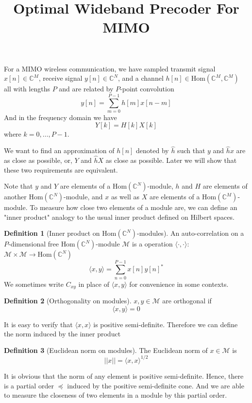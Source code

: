 \documentclass[12pt]{article}
\title{Optimal Wideband Precoder For MIMO}
\theoremstyle{definition}
\newtheorem{definition}{Definition}
\begin{document}
\maketitle
For a MIMO wireless communication, we have sampled transmit signal $x[n]\in\mathbb{C}^M$, receive signal $y[n]\in\mathbb{C}^N$, and a channel $h[n]\in\mbox{Hom}\left(\mathbb{C}^M, \mathbb{C}^M\right)$ all with lengths $P$ and are related by $P$-point convolution
$$y[n]=\sum_{m=0}^{P-1}h[m]x[n-m]$$
And in the frequency domain we have
$$Y[k]=H[k]X[k]$$
where $k=0,\dots,P-1$.

We want to find an approximation of $h[n]$ denoted by $\hat{h}$ such that $y$ and $\hat{h}x$ are as close as possible, or, $Y$ and $\hat{h}X$ as close as possible. Later we will show that these two requirements are equivalent.

Note that $y$ and $Y$ are elements of a $\mbox{Hom}\left(\mathbb{C}^N \right)$-module, $h$ and $H$ are elements of another $\mbox{Hom}\left(\mathbb{C}^N \right)$-module, and $x$ as well as $X$ are elements of a $\mbox{Hom}\left(\mathbb{C}^M \right)$-module. To measure how close two elements of a module are, we can define an "inner product" analogy to the usual inner product defined on Hilbert spaces.
\begin{definition}[Inner product on $\mbox{Hom}\left(\mathbb{C}^N \right)$-modules]\label{def inner product}
	An auto-correlation on a $P$-dimensional free $\mbox{Hom}\left(\mathbb{C}^N \right)$-module $\mathcal{M}$ is a operation $\langle\cdot,\cdot\rangle$: $\mathcal{M}\times\mathcal{M}\rightarrow\mbox{Hom}\left(\mathbb{C}^N \right)$
	$$\langle x,y\rangle=\sum_{n=0}^{P-1}x[n]y[n]^*$$
	We sometimes write $C_{xy}$ in place of $\langle x,y\rangle$ for convenience in some contexts.
\end{definition}
\begin{definition}[Orthogonality on modules]\label{def orthogonality}
	$x,y\in\mathcal{M}$ are orthogonal if
	$$\langle x,y\rangle=0$$
\end{definition}
It is easy to verify that $\langle x,x\rangle$ is positive semi-definite. Therefore we can define the norm induced by the inner product
\begin{definition}[Euclidean norm on modules]\label{def norm}
	The Euclidean norm of $x\in\mathcal{M}$ is 
	$$||x||=\langle x,x\rangle^{1/2}$$
\end{definition}
It is obvious that the norm of any element is positive semi-definite. Hence, there is a partial order $\preceq$ induced by the positive semi-definite cone. And we are able to measure the closeness of two elements in a module by this partial order.
\end{document}
